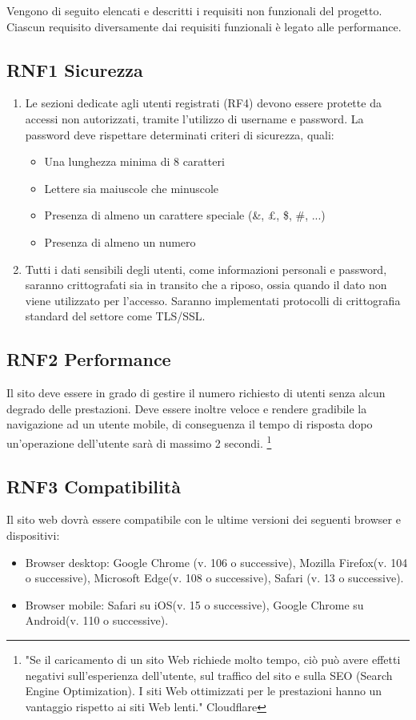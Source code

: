 \documentclass[a4paper,12pt]{article}
\begin{document}
Vengono di seguito elencati e descritti i requisiti non funzionali del progetto. Ciascun requisito diversamente dai requisiti funzionali è legato alle performance.

\subsection*{RNF1 Sicurezza}
\begin{enumerate}[label = \alph*]
    \item Le sezioni dedicate agli utenti registrati (RF4) devono essere protette da accessi non autorizzati, tramite l’utilizzo di username e password. 
    La password deve rispettare determinati criteri di sicurezza, quali: 
        \begin{itemize}
            \item Una lunghezza minima di 8 caratteri
            \item Lettere sia maiuscole che minuscole
            \item Presenza di almeno un carattere speciale (\&, £, \$, \#, ...)
            \item Presenza di almeno un numero 
        \end{itemize}
    \item Tutti i dati sensibili degli utenti, come informazioni personali e password, saranno crittografati sia in transito che a riposo, ossia quando il dato non viene utilizzato per l'accesso. Saranno implementati protocolli di crittografia standard del settore come TLS/SSL.
\end{enumerate}


\subsection*{RNF2 Performance}
Il sito deve essere in grado di gestire il numero richiesto di utenti senza alcun degrado delle prestazioni. Deve essere inoltre veloce e rendere gradibile la navigazione ad un utente mobile, di conseguenza il tempo di risposta dopo un'operazione dell'utente sarà di massimo 2 secondi. \footnote{"Se il caricamento di un sito Web richiede molto tempo, ciò può avere effetti negativi sull'esperienza dell'utente, sul traffico del sito e sulla SEO (Search Engine Optimization). I siti Web ottimizzati per le prestazioni hanno un vantaggio rispetto ai siti Web lenti."    Cloudflare }


\subsection*{RNF3 Compatibilità}
Il sito web dovrà essere compatibile con le ultime versioni dei seguenti browser e dispositivi:
\begin{itemize}
    \item Browser desktop: Google Chrome (v. 106 o successive), Mozilla Firefox(v. 104 o successive), Microsoft Edge(v. 108 o successive), Safari (v. 13 o successive).
     \item Browser mobile: Safari su iOS(v. 15 o successive), Google Chrome su Android(v. 110 o successive).
\end{itemize}
\end{document}
